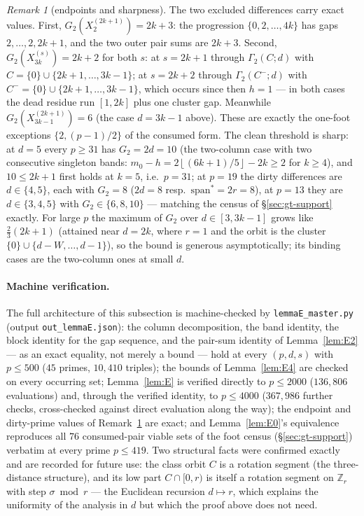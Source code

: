 \documentclass[11pt,a4paper]{article}
\numberwithin{equation}{section}
\theoremstyle{plain}
\theoremstyle{definition}
\theoremstyle{remark}
\newtheorem{remark}[theorem]{Remark}
\newcommand{\Z}{\mathbb{Z}}
\newcommand{\floor}[1]{\left\lfloor #1 \right\rfloor}
\begin{document}
\begin{remark}[endpoints and sharpness]\label{rem:Esharp}
The two excluded differences carry exact values. First,
$G_2(X^{(2k+1)}_2)=2k{+}3$: the progression $\{0,2,\dots,4k\}$ has gaps
$2,\dots,2,2k{+}1$, and the two outer pair sums are $2k+3$. Second,
$G_2(X^{(s)}_{3k})=2k{+}2$ for both $s$: at $s=2k{+}1$ through
$\Gamma_2(C;d)$ with $C=\{0\}\cup\{2k{+}1,\dots,3k-1\}$; at
$s=2k{+}2$ through $\Gamma_2(C^-;d)$ with
$C^-=\{0\}\cup\{2k{+}1,\dots,3k-1\}$, which occurs since then $h=1$
--- in both cases the dead residue run $[1,2k]$ plus one cluster gap.
Meanwhile $G_2(X^{(2k+1)}_{3k-1})=6$ (the case $d=3k-1$ above). These
are exactly the one-foot exceptions $\{2,(p{-}1)/2\}$ of the consumed
form. The clean threshold is sharp: at $d=5$ every $p\ge31$ has
$G_2=2d=10$ (the two-column case with two consecutive singleton bands:
$m_0-h=2\floor{(6k+1)/5}-2k\ge2$ for $k\ge4$), and $10\le2k+1$ first
holds at $k=5$, i.e.\ $p=31$; at $p=19$ the dirty differences are
$d\in\{4,5\}$, each with $G_2=8$ ($2d=8$ resp.\
$\mathrm{span}^\ast=2r=8$), at $p=13$ they are $d\in\{3,4,5\}$ with
$G_2\in\{6,8,10\}$ --- matching the census of \S\ref{sec:gt-support}
exactly. For large $p$ the maximum of $G_2$ over $d\in[3,3k-1]$ grows
like $\tfrac23(2k+1)$ (attained near $d=2k$, where $r=1$ and the orbit
is the cluster $\{0\}\cup\{d-W,\dots,d-1\}$), so the bound is generous
asymptotically; its binding cases are the two-column ones at small
$d$.
\end{remark}

\paragraph{Machine verification.}
The full architecture of this subsection is machine-checked by
\texttt{lemmaE\_\allowbreak master.py} (output
\texttt{out\_\allowbreak lemmaE.json}): the
column decomposition, the band identity, the block identity for the gap
sequence, and the pair-sum identity of Lemma~\ref{lem:E2} --- as an
exact equality, not merely a bound --- hold at every $(p,d,s)$ with
$p\le500$ ($45$ primes, $10{,}410$ triples); the bounds of
Lemma~\ref{lem:E4} are checked on every occurring set;
Lemma~\ref{lem:E} is verified directly to $p\le2000$ ($136{,}806$
evaluations) and, through the verified identity, to $p\le4000$
($367{,}986$ further checks, cross-checked against direct evaluation
along the way); the endpoint and dirty-prime values of
Remark~\ref{rem:Esharp} are exact; and Lemma~\ref{lem:E0}'s equivalence
reproduces all $76$ consumed-pair viable sets of the foot census
(\S\ref{sec:gt-support}) verbatim at every prime $p\le419$. Two
structural facts were confirmed exactly and are recorded for future
use: the class orbit $C$ is a rotation segment (the three-distance
structure), and its low part $C\cap[0,r)$ is itself a rotation segment
on $\Z_r$ with step $\sigma\bmod r$ --- the Euclidean recursion
$d\mapsto r$, which explains the uniformity of the analysis in $d$ but
which the proof above does not need.
\end{document}
